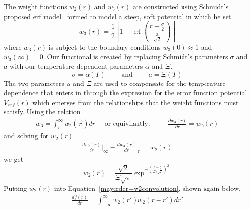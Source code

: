 \documentclass[double,12pt]{beavtex}
\begin{document}
The weight functions $w_{2}(r)$ and $w_{3}(r)$ are constructed using 
Schmidt's proposed erf model~\cite{schmidt2000fluid} formed to model a steep, 
soft potential in which he set
\begin{equation}{w_3(r)=\frac{1}{2}}\left[1-\operatorname{erf}\left(\frac{r-\frac{\sigma}{2}}{\frac{\text{a}}{\sqrt{2}}}\right)\right]\end{equation} 
where $w_3(r)$ is subject to the boundary conditions $w_3(0)\approx{1}$ 
and $w_3(\infty)=0$. 
Our functional is  created by replacing Schmidt's parameters $\sigma$ 
and $a$ with our temperature dependent parameters $\alpha$ and $\Xi$.
\begin{equation}\sigma = \alpha(T)\text{~~~~~~~and~~~~~~~} a = \Xi(T)\end{equation}
%
The two parameters $\alpha$ and $\Xi$ are used to compensate for the 
temperature dependence that enters in through the expression for the 
error function potential $V_{erf}(r)$ which 
emerges from the relationships
that the weight functions must satisfy.
Using the relation
\begin{align}{w_{3}=\int_{r}^{\infty}{w_{2}(\vec{r})dr}\mbox{~~~~or equivilantly,~~~~}-\frac{\partial{w_3(r)}}{\partial{r}}=w_2(r)}\end{align}
and solving for $w_2(r)$
\begin{align}{\frac{dw_3(r)}{dr}\bigg|_{\infty}-\frac{dw_3(r)}{dr}\bigg|_{r}=w_2(r)}\end{align} 
we get \begin{equation}{ w_2(r)=\frac{\sqrt{2}}{\Xi\sqrt\pi}\exp^{-\left(\frac{r-\frac{\alpha}{2}}{\Xi/\sqrt{2}}\right)^2} }\end{equation} %
Putting $w_2(r)$ into Equation~\ref{mayerder=w2convolution}, shown again below, 
\begin{align}{\frac{df(r)}{dr}=\int_{-\infty}^{\infty}{w_2(r')w_2(r-r')dr'}}\end{align}
\end{document}

